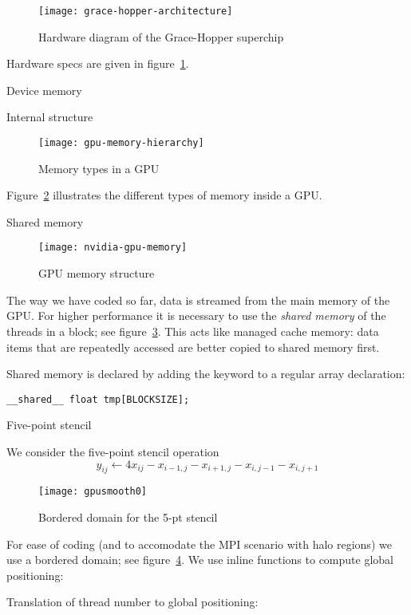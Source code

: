 \begin{figure}[ht]
  \texttt{[image: grace-hopper-architecture]}
  \caption{Hardware diagram of the Grace-Hopper superchip}
  \label{fig:grace-hopper-hardware}
\end{figure}
Hardware specs are given in figure~\ref{fig:grace-hopper-hardware}.

 {Device memory}

 {Internal structure}

\begin{figure}[ht]
  \texttt{[image: gpu-memory-hierarchy]}
  \caption{Memory types in a GPU}
  \label{fig:gpu-hierarchy}
\end{figure}
Figure~\ref{fig:gpu-hierarchy} illustrates the different types of
memory inside a GPU.

 {Shared memory}

\begin{figure}[ht]
  \texttt{[image: nvidia-gpu-memory]}  
  \caption{GPU memory structure}
  \label{fig:gpu-memory}
\end{figure}
The way we have coded so far, data is streamed from the
main memory of the \ac{GPU}.
For higher performance it is necessary to use the
\emph{shared memory}
of the threads in a block; 
see figure~\ref{fig:gpu-memory}.
This acts like managed cache memory:
data items that are repeatedly accessed
are better copied to shared memory first.

Shared memory is declared by adding the keyword
 to a regular array declaration:
\begin{lstlisting}
__shared__ float tmp[BLOCKSIZE];
\end{lstlisting}

 {Five-point stencil}

We consider the five-point stencil operation
\[ y_{ij} \leftarrow 4x_{ij} -x_{i-1,j} -x_{i+1,j} -x_{i,j-1} -x_{i,j+1} \]
\begin{figure}[ht]
  \texttt{[image: gpusmooth0]}
  \caption{Bordered domain for the 5-pt stencil}
  \label{fig:cusmooth0}  
\end{figure}
For ease of coding (and to accomodate the MPI scenario with halo regions)
we use a bordered domain; see figure~\ref{fig:cusmooth0}.
We use inline functions to compute global positioning:

Translation of thread number to global positioning:

